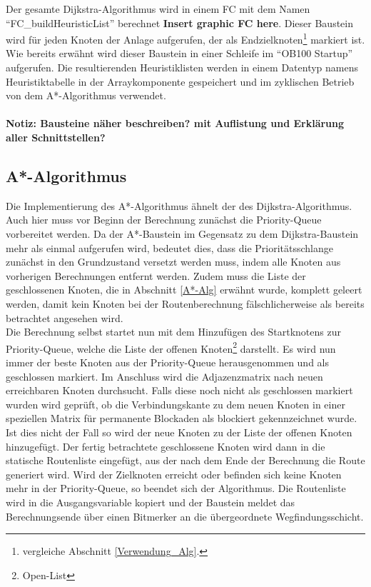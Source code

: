 			Der gesamte Dijkstra-Algorithmus wird in einem \ac{FC} mit dem Namen "`FC\_buildHeuristicList"' berechnet \textbf{Insert graphic FC here}. Dieser Baustein wird für jeden Knoten der Anlage aufgerufen, der als Endzielknoten\footnote{vergleiche Abschnitt \ref{Verwendung_Alg}.} markiert ist. Wie bereits erwähnt wird dieser Baustein in einer Schleife im "`\ac{OB}100 Startup"' aufgerufen. Die resultierenden Heuristiklisten werden in einem Datentyp namens Heuristiktabelle in der Arraykomponente gespeichert und im zyklischen Betrieb von dem A*-Algorithmus verwendet. 
			\\
			\\
			\textbf{Notiz: Bausteine näher beschreiben? mit Auflistung und Erklärung aller Schnittstellen?}
			

		\subsection{A*-Algorithmus}
			\label{Implementierung A*}
			Die Implementierung des A*-Algorithmus ähnelt der des Dijkstra-Algorithmus. Auch hier muss vor Beginn der Berechnung zunächst die Priority-Queue vorbereitet werden. Da der A*-Baustein im Gegensatz zu dem Dijkstra-Baustein mehr als einmal aufgerufen wird,  bedeutet dies, dass die Prioritätsschlange zunächst in den Grundzustand versetzt werden muss, indem alle Knoten aus vorherigen Berechnungen entfernt werden. Zudem muss die Liste der geschlossenen Knoten, die in Abschnitt \ref{A*-Alg} erwähnt wurde, komplett geleert werden, damit kein Knoten bei der Routenberechnung fälschlicherweise als bereits betrachtet angesehen wird.\\
			
			Die Berechnung selbst startet nun mit dem Hinzufügen des Startknotens zur Priority-Queue, welche die Liste der offenen Knoten\footnote{Open-List} darstellt. Es wird nun immer der beste Knoten aus der Priority-Queue herausgenommen und als geschlossen markiert. Im Anschluss wird die Adjazenzmatrix nach neuen erreichbaren Knoten durchsucht. Falls diese noch nicht als geschlossen markiert wurden wird geprüft, ob die Verbindungskante zu dem neuen Knoten in einer speziellen Matrix für permanente Blockaden als blockiert gekennzeichnet wurde. Ist dies nicht der Fall so wird der neue Knoten zu der Liste der offenen Knoten hinzugefügt. Der fertig betrachtete geschlossene Knoten wird dann in die statische Routenliste eingefügt, aus der nach dem Ende der Berechnung die Route generiert wird. Wird der Zielknoten erreicht oder befinden sich keine Knoten mehr in der Priority-Queue, so beendet sich der Algorithmus. Die Routenliste wird in die Ausgangsvariable kopiert und der Baustein meldet das Berechnungsende über einen Bitmerker an die übergeordnete Wegfindungsschicht.\\
			
